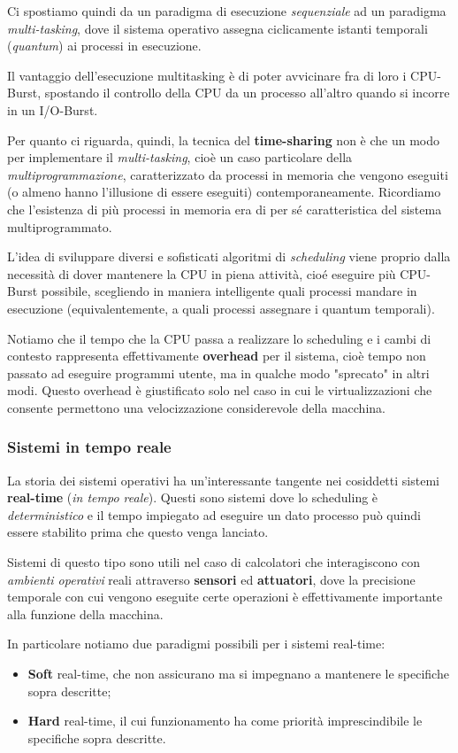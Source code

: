 \documentclass[a4paper,11pt]{article}
\begin{document}
Ci spostiamo quindi da un paradigma di esecuzione \textit{sequenziale} ad un paradigma \textit{multi-tasking}, dove il sistema operativo assegna ciclicamente istanti temporali (\textit{quantum}) ai processi in esecuzione.

Il vantaggio dell'esecuzione multitasking è di poter avvicinare fra di loro i CPU-Burst, spostando il controllo della CPU da un processo all'altro quando si incorre in un I/O-Burst.

Per quanto ci riguarda, quindi, la tecnica del \textbf{time-sharing} non è che un modo per implementare il \textit{multi-tasking}, cioè un caso particolare della \textit{multiprogrammazione}, caratterizzato da processi in memoria che vengono eseguiti (o almeno hanno l'illusione di essere eseguiti) contemporaneamente. 
Ricordiamo che l'esistenza di più processi in memoria era di per sé caratteristica del sistema multiprogrammato.

L'idea di sviluppare diversi e sofisticati algoritmi di \textit{scheduling} viene proprio dalla necessità di dover mantenere la CPU in piena attività, cioé eseguire più CPU-Burst possibile, scegliendo in maniera intelligente quali processi mandare in esecuzione (equivalentemente, a quali processi assegnare i quantum temporali).

Notiamo che il tempo che la CPU passa a realizzare lo scheduling e i cambi di contesto rappresenta effettivamente \textbf{overhead} per il sistema, cioè tempo non passato ad eseguire programmi utente, ma in qualche modo "sprecato" in altri modi.
Questo overhead è giustificato solo nel caso in cui le virtualizzazioni che consente permettono una velocizzazione considerevole della macchina.

\subsubsection{Sistemi in tempo reale}
La storia dei sistemi operativi ha un'interessante tangente nei cosiddetti sistemi \textbf{real-time} (\textit{in tempo reale}).
Questi sono sistemi dove lo scheduling è \textit{deterministico} e il tempo impiegato ad eseguire un dato processo può quindi essere stabilito prima che questo venga lanciato.

Sistemi di questo tipo sono utili nel caso di calcolatori che interagiscono con \textit{ambienti operativi} reali attraverso \textbf{sensori} ed \textbf{attuatori}, dove la precisione temporale con cui vengono eseguite certe operazioni è effettivamente importante alla funzione della macchina.

In particolare notiamo due paradigmi possibili per i sistemi real-time:
\begin{itemize}
	\item \textbf{Soft} real-time, che non assicurano ma si impegnano a mantenere le specifiche sopra descritte;
	\item \textbf{Hard} real-time, il cui funzionamento ha come priorità imprescindibile le specifiche sopra descritte. 
\end{itemize}
\end{document}
